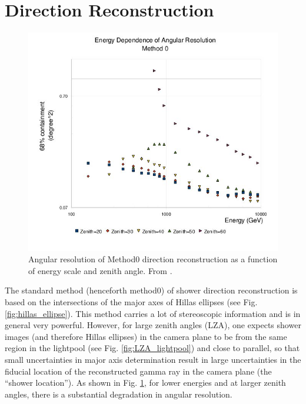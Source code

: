 \documentclass[main.tex]{subfiles}
\begin{document}
\section{Direction Reconstruction}
\begin{figure}[htbp]
  \centering
  \includegraphics[width=.6\linewidth]{images/Method0_res}
  \caption[Angular resolution of Method0.]{Angular resolution of Method0 direction reconstruction as a function of energy scale and zenith angle. From \cite{veritas_web}.}
  \label{fig:disp_res}
\end{figure}
The standard method (henceforth method0) of shower direction reconstruction is based on the intersections of the major axes of Hillas ellipses (see Fig. \ref{fig:hillas_ellipse}). This method carries a lot of stereoscopic information and is in general very powerful. However, for large zenith angles (LZA), one expects shower images (and therefore Hillas ellipses) in the camera plane to be from the same region in the lightpool (see Fig. \ref{fig:LZA_lightpool}) and close to parallel, so that small uncertainties in major axis determination result in large uncertainties in the fiducial location of the reconstructed gamma ray in the camera plane (the ``shower location''). As shown in Fig. \ref{fig:disp_res}, for lower energies and at larger zenith angles, there is a substantial degradation in angular resolution.
\end{document}
